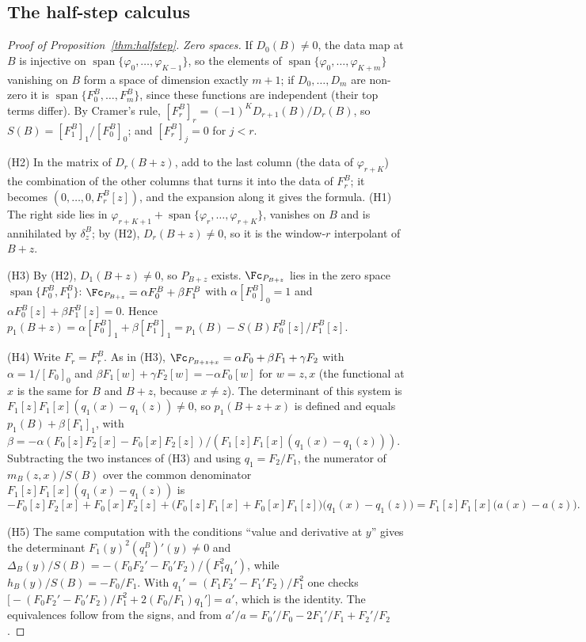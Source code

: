 \subsection{The half-step calculus}\label{app:proofs-halfstep}
\begin{proof}[Proof of Proposition~\textup{\ref{thm:halfstep}}]
\emph{Zero spaces.} If $D_0(B)\ne0$, the data map at $B$ is injective on $\operatorname{span}\{\varphi_0,\dots,\varphi_{K-1}\}$,
so the elements of $\operatorname{span}\{\varphi_0,\dots,\varphi_{K+m}\}$ vanishing on $B$ form a space of dimension
exactly $m+1$; if $D_0,\dots,D_m$ are non-zero it is $\operatorname{span}\{F_0^B,\dots,F_m^B\}$, since these functions are
independent (their top terms differ). By Cramer's rule, $[F_r^B]_r=(-1)^KD_{r+1}(B)/D_r(B)$, so
$S(B)=[F_1^B]_1/[F_0^B]_0$; and $[F_r^B]_j=0$ for $j<r$.

(H2) In the matrix of $D_r(B+z)$, add to the last column (the data of $\varphi_{r+K}$) the combination of the other
columns that turns it into the data of $F_r^B$; it becomes $(0,\dots,0,F_r^B[z])$, and the expansion along it gives
the formula. (H1) The right side lies in $\varphi_{r+K+1}+\operatorname{span}\{\varphi_r,\dots,\varphi_{r+K}\}$, vanishes on $B$ and is
annihilated by $\delta^B_z$; by (H2), $D_r(B+z)\ne0$, so it is the window-$r$ interpolant of $B+z$.

(H3) By (H2), $D_1(B+z)\ne0$, so $P_{B+z}$ exists. $\Fc_{P_{B+z}}$ lies in the zero space
$\operatorname{span}\{F_0^B,F_1^B\}$: $\Fc_{P_{B+z}}=\alpha F_0^B+\beta F_1^B$ with $\alpha[F_0^B]_0=1$ and
$\alpha F_0^B[z]+\beta F_1^B[z]=0$. Hence
$p_1(B+z)=\alpha[F_0^B]_1+\beta[F_1^B]_1=p_1(B)-S(B)F_0^B[z]/F_1^B[z]$.

(H4) Write $F_r=F_r^B$. As in (H3), $\Fc_{P_{B+z+x}}=\alpha F_0+\beta F_1+\gamma F_2$ with $\alpha=1/[F_0]_0$ and
$\beta F_1[w]+\gamma F_2[w]=-\alpha F_0[w]$ for $w=z,x$ (the functional at $x$ is the same for $B$ and $B+z$, because
$x\ne z$). The determinant of this system is $F_1[z]F_1[x](q_1(x)-q_1(z))\ne0$, so $p_1(B+z+x)$ is defined and
equals $p_1(B)+\beta[F_1]_1$, with $\beta=-\alpha(F_0[z]F_2[x]-F_0[x]F_2[z])/(F_1[z]F_1[x](q_1(x)-q_1(z)))$.
Subtracting the two instances of (H3) and using $q_1=F_2/F_1$, the numerator of $m_B(z,x)/S(B)$ over the common
denominator $F_1[z]F_1[x](q_1(x)-q_1(z))$ is
\[
-F_0[z]F_2[x]+F_0[x]F_2[z]+\bigl(F_0[z]F_1[x]+F_0[x]F_1[z]\bigr)\bigl(q_1(x)-q_1(z)\bigr)
=F_1[z]F_1[x]\bigl(a(x)-a(z)\bigr).
\]

(H5) The same computation with the conditions ``value and derivative at $y$'' gives the determinant
$F_1(y)^2(q_1^B)'(y)\ne0$ and
$\Delta_B(y)/S(B)=-(F_0F_2'-F_0'F_2)/(F_1^2q_1')$, while $h_B(y)/S(B)=-F_0/F_1$. With
$q_1'=(F_1F_2'-F_1'F_2)/F_1^2$ one checks
$\bigl[-(F_0F_2'-F_0'F_2)/F_1^2+2(F_0/F_1)q_1'\bigr]=a'$, which is the identity. The equivalences follow from
the signs, and from $a'/a=F_0'/F_0-2F_1'/F_1+F_2'/F_2$.


\end{proof}
